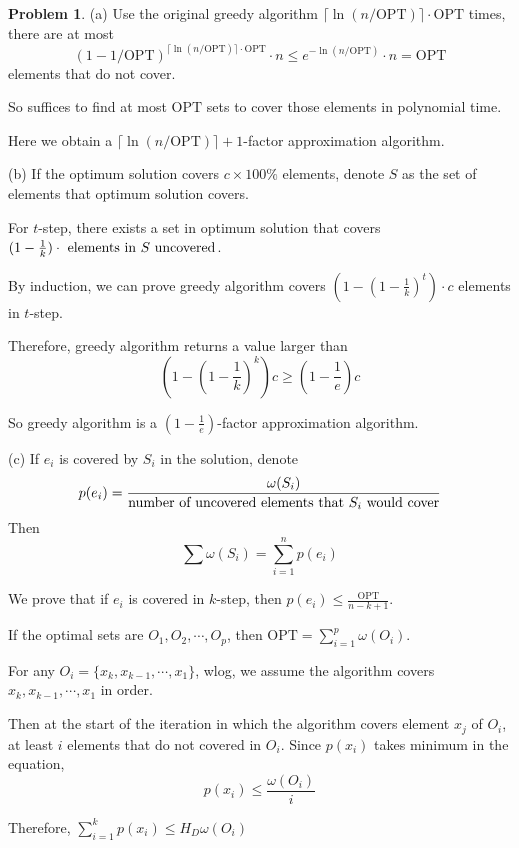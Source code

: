\documentclass[a4paper]{article}
\theoremstyle{definition}
\newtheorem{problem}{Problem}
\theoremstyle{plain}
\newcommand{\dps}{\displaystyle}
\newcommand{\OPT}{\mathrm{OPT}}
\numberwithin{equation}{problem}
\begin{document}
\begin{problem}
  (a) Use the original greedy algorithm  $ \lceil \ln(n/\OPT)\rceil \cdot \OPT $ times, there are at most 
  \[(1-1/\OPT)^{\lceil \ln(n/\OPT)\rceil \cdot \OPT}\cdot n \leq e^{-\ln(n/\OPT)}\cdot n=\OPT\]
  elements that do not cover.

  So suffices to find at most $ \OPT $  sets to cover those elements in polynomial time.

  Here we obtain a  $ \lceil \ln(n/\OPT)\rceil+1 $-factor approximation algorithm.
  
  (b) If  the optimum solution covers  $ c\times 100\% $ elements, denote  $ S $ as the set of elements that optimum solution covers.
  
  For  $ t $-step, there exists a set in optimum solution that covers  $ (1-\frac{1}{k})\cdot \text{ elements in  $ S $ uncovered} $.
  
  By induction, we can prove greedy algorithm covers  $(1-(1- \frac{1}{k})^t)\cdot c $ elements in  $ t $-step.
  
  Therefore, greedy algorithm returns a value larger than 
  \[(1-(1-\frac{1}{k})^k)c  \geq (1-\frac{1}{e})c\]

  So greedy algorithm is a  $ (1-\frac{1}{e}) $-factor approximation algorithm.
  
  (c) If  $ e_i $ is covered by  $ S_i $ in the solution, denote 
  \[p(e_i)=\frac{\omega(S_i)}{\text{number of uncovered elements that  $ S_i $ would cover}}\]
  Then 
  \[\sum \omega(S_i)=\sum_{i=1}^n p(e_i)\]

  We prove that if  $ e_i $ is covered in  $ k $-step, then  $ p(e_i) \leq \frac{\OPT}{n-k+1} $.
  
  If the optimal sets are  $ O_1,O_2,\cdots,O_{p} $,  then  $ \OPT=\dps\sum_{i=1}^p\omega( O_i) $.
  
  For any  $ O_i=\{x_k,x_{k-1},\cdots, x_1\} $, wlog, we assume the algorithm covers  $ x_k,x_{k-1},\cdots,x_1 $ in order.
  
  Then  at the start of the iteration in which the algorithm covers element  $ x_j $  of  $ O_i $, at least  $ i $ elements that do not covered in  $ O_i $. Since  $ p(x_i) $ takes  minimum in the equation, 
  \[p(x_i) \leq \frac{\omega(O_i)}{i}\]
  
  Therefore,  $ \dps\sum_{i=1}^k p(x_i) \leq H_D\omega(O_i) $ 


\end{problem}
\end{document}
